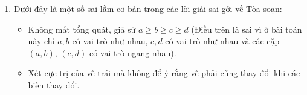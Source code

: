 \begin{bt}
{\begin{nx}
\begin{enumerate}[1.]
	\[\dfrac{1}{ab}+\dfrac{1}{cd}+ab+cd+(a+b)(c+d)\geq 8,\]
	đã chứng minh bất đẳng thức đó bằng cách chứng minh bất đẳng thức trung gian
	\[ \dfrac{1}{ab}+\dfrac{1}{cd}+ab+cd\geq \dfrac{(a+b+c+d)^2}{(a+b)(c+d)},\]
	rồi vận dụng bất đẳng thức trung bình cộng - trung bình nhân để hoàn tất chứng minh.
	\item Dưới đây là một số sai lầm cơ bản trong các lời giải sai gởi về Tòa soạn:
	\begin{itemize}
		\item  Không mất tổng quát, giả sử $a\geq b \geq c \geq d$ (Điều trên là sai vì ở bài toán này chỉ $a,b$ có vai trò như nhau, $c,d$ có vai trò như nhau và các cặp $(a,b)$, $(c,d)$ có vai trò ngang nhau).
		\item Xét cực trị của vế trái mà không để ý rằng vế phải cũng thay đổi khi các biến thay đổi.
	\end{itemize}
\end{enumerate}
\end{nx}
}

\end{bt}
